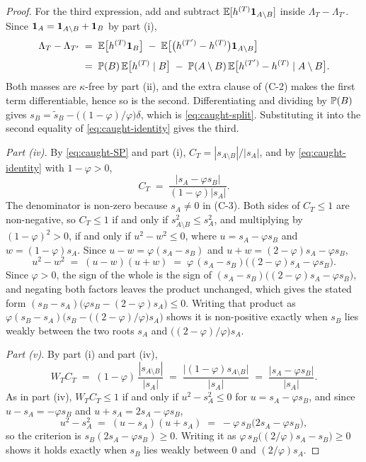 \begin{proof}
For the third expression, add and subtract $\mathbb{E}[h^{(T)}\mathbf{1}_{A\setminus B}]$ inside
$\Lambda_T-\Lambda_{T'}$. Since $\mathbf{1}_A = \mathbf{1}_{A\setminus B}+\mathbf{1}_B$ by part (i),
\[
\begin{aligned}
\Lambda_T - \Lambda_{T'}
\;&=\; \mathbb{E}\bigl[h^{(T)}\mathbf{1}_B\bigr]
  \;-\; \mathbb{E}\bigl[\bigl(h^{(T')}-h^{(T)}\bigr)\mathbf{1}_{A\setminus B}\bigr] \\[3pt]
\;&=\; \mathbb{P}(B)\,\mathbb{E}\bigl[h^{(T)}\mid B\bigr]
  \;-\; \mathbb{P}(A\setminus B)\,\mathbb{E}\bigl[h^{(T')}-h^{(T)}\mid A\setminus B\bigr] .
\end{aligned}
\]
Both masses are $\kappa$-free by part (ii), and the extra clause of (C-2) makes the first term
differentiable, hence so is the second. Differentiating and dividing by $\mathbb{P}(B)$ gives
$s_B = \tilde s_B - \bigl((1-\varphi)/\varphi\bigr)\delta$, which is \eqref{eq:caught-split}.
Substituting it into the second equality of \eqref{eq:caught-identity} gives
the third.

\emph{Part (iv).} By \eqref{eq:caught-SP} and part (i), $C_T = |s_{A\setminus B}|/|s_A|$, and by
\eqref{eq:caught-identity} with $1-\varphi>0$,
\[
C_T \;=\; \frac{|s_A-\varphi s_B|}{(1-\varphi)|s_A|} .
\]
The denominator is non-zero because $s_A \ne 0$ in (C-3). Both sides of $C_T\le 1$ are
non-negative, so $C_T\le 1$ if and only if $s_{A\setminus B}^2\le s_A^2$, and multiplying by
$(1-\varphi)^2>0$, if and only if $u^2-w^2\le 0$, where $u=s_A-\varphi s_B$ and
$w=(1-\varphi)s_A$. Since $u-w=\varphi(s_A-s_B)$ and $u+w=(2-\varphi)s_A-\varphi s_B$,
\[
u^2-w^2 \;=\; (u-w)(u+w) \;=\; \varphi\,(s_A-s_B)\bigl((2-\varphi)s_A-\varphi s_B\bigr).
\]
Since $\varphi>0$, the sign of the whole is the sign of
$(s_A-s_B)\bigl((2-\varphi)s_A-\varphi s_B\bigr)$, and negating both factors leaves the product
unchanged, which gives the stated form
$(s_B-s_A)\bigl(\varphi s_B-(2-\varphi)s_A\bigr)\le 0$. Writing that product as
$\varphi(s_B-s_A)\bigl(s_B-\bigl((2-\varphi)/\varphi\bigr)s_A\bigr)$ shows it is non-positive
exactly when $s_B$ lies weakly between the two roots $s_A$ and
$\bigl((2-\varphi)/\varphi\bigr)s_A$.

\emph{Part (v).} By part (i) and part (iv),
\[
W_T C_T \;=\; (1-\varphi)\,\frac{|s_{A\setminus B}|}{|s_A|}
\;=\; \frac{\bigl|(1-\varphi)s_{A\setminus B}\bigr|}{|s_A|}
\;=\; \frac{|s_A-\varphi s_B|}{|s_A|} .
\]
As in part (iv), $W_T C_T\le 1$ if and only if $u^2-s_A^2\le 0$ for $u=s_A-\varphi s_B$, and since
$u-s_A=-\varphi s_B$ and $u+s_A=2s_A-\varphi s_B$,
\[
u^2-s_A^2 \;=\; (u-s_A)(u+s_A) \;=\; -\varphi\,s_B\bigl(2s_A-\varphi s_B\bigr),
\]
so the criterion is $s_B(2s_A-\varphi s_B)\ge 0$. Writing it as
$\varphi\,s_B\bigl((2/\varphi)s_A-s_B\bigr)\ge 0$ shows it holds exactly when $s_B$ lies weakly
between $0$ and $(2/\varphi)s_A$.


\end{proof}

